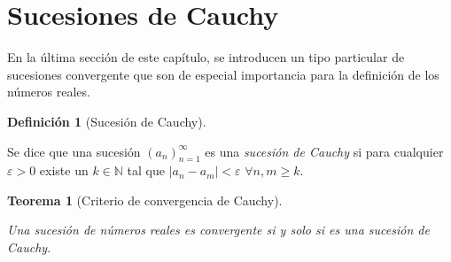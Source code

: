 \documentclass[
  a4paper,
]{scrreport}
\theoremstyle{definition}
\theoremstyle{plain}
\theoremstyle{definition}
\newtheorem{definition}{Definición}[chapter]
\theoremstyle{definition}
\theoremstyle{plain}
\newtheorem{theorem}{Teorema}[chapter]
\theoremstyle{plain}
\theoremstyle{remark}
\begin{document}
\section{Sucesiones de Cauchy}\label{sucesiones-de-cauchy}

En la última sección de este capítulo, se introducen un tipo particular
de sucesiones convergente que son de especial importancia para la
definición de los números reales.

\begin{definition}[Sucesión de
Cauchy]\protect\hypertarget{def-sucesion-cauchy}{}\label{def-sucesion-cauchy}

Se dice que una sucesión \((a_n)_{n=1}^\infty\) es una \emph{sucesión de
Cauchy} si para cualquier \(\varepsilon>0\) existe un \(k\in\mathbb{N}\)
tal que \(|a_n-a_m|<\varepsilon\) \(\forall n,m\geq k\).

\end{definition}

\begin{theorem}[Criterio de convergencia de
Cauchy]\protect\hypertarget{thm-criterio-convergencia-cauchy}{}\label{thm-criterio-convergencia-cauchy}

Una sucesión de números reales es convergente si y solo si es una
sucesión de Cauchy.

\end{theorem}
\end{document}
